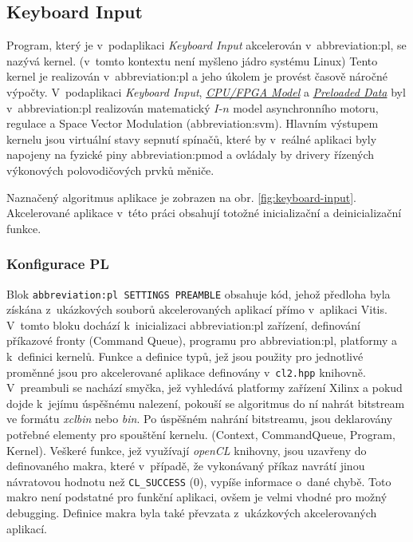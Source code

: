 \documentclass[a4paper, twoside, 11pt]{article}
\newcommand{\fbar}{\FloatBarrier}
\begin{document}
	\fbar
	\subsection{Keyboard Input}\label{subsec:keyboard-input}
		Program, který je v~podaplikaci \textit{Keyboard Input} akcelerován v~\gls{abbreviation:pl}, se nazývá kernel. (v~tomto kontextu není myšleno jádro systému Linux) Tento kernel je realizován v~\gls{abbreviation:pl} a jeho úkolem je provést časově náročné výpočty. V~podaplikaci \textit{Keyboard Input}, \hyperref[subsec:cpu-fpga]{\textit{CPU/FPGA Model}} a \hyperref[subsec:preloaded-data]{\textit{Preloaded Data}} byl v~\gls{abbreviation:pl} realizován matematický $I$-$n$ model asynchronního motoru, regulace a Space Vector Modulation (\gls{abbreviation:svm}). Hlavním výstupem kernelu jsou virtuální stavy sepnutí spínačů, které by v~reálné aplikaci byly napojeny na fyzické piny \gls{abbreviation:pmod} a ovládaly by drivery řízených výkonových polovodičových prvků měniče.\par
		Naznačený algoritmus aplikace je zobrazen na obr. \ref{fig:keyboard-input}. Akcelerované aplikace v~této práci obsahují totožné inicializační a deinicializační funkce.\par
		\subsubsection{Konfigurace PL}
		Blok \texttt{\gls{abbreviation:pl} SETTINGS PREAMBLE} obsahuje kód, jehož předloha byla získána z~ukázkových souborů akcelerovaných aplikací přímo v~aplikaci Vitis. V~tomto bloku dochází k~inicializaci \gls{abbreviation:pl} zařízení, definování příkazové fronty (Command Queue), programu pro \gls{abbreviation:pl}, platformy a k~definici kernelů. Funkce a definice typů, jež jsou použity pro jednotlivé proměnné jsou pro akcelerované aplikace definovány v~\texttt{cl2.hpp} knihovně. V~preambuli se nachází smyčka, jež vyhledává platformy zařízení Xilinx a pokud dojde k~jejímu úspěšnému nalezení, pokouší se algoritmus do ní nahrát bitstream ve formátu \textit{xclbin} nebo \textit{bin}. Po úspěšném nahrání bitstreamu, jsou deklarovány potřebné elementy pro spouštění kernelu. (Context, CommandQueue, Program, Kernel). Veškeré funkce, jež využívají \textit{openCL} knihovny, jsou uzavřeny do definovaného makra, které v~případě, že vykonávaný příkaz navrátí jinou návratovou hodnotu než \texttt{CL\_SUCCESS} (0), vypíše informace o~dané chybě. Toto makro není podstatné pro funkční aplikaci, ovšem je velmi vhodné pro možný debugging. Definice makra byla také převzata z~ukázkových akcelerovaných aplikací.
\end{document}
